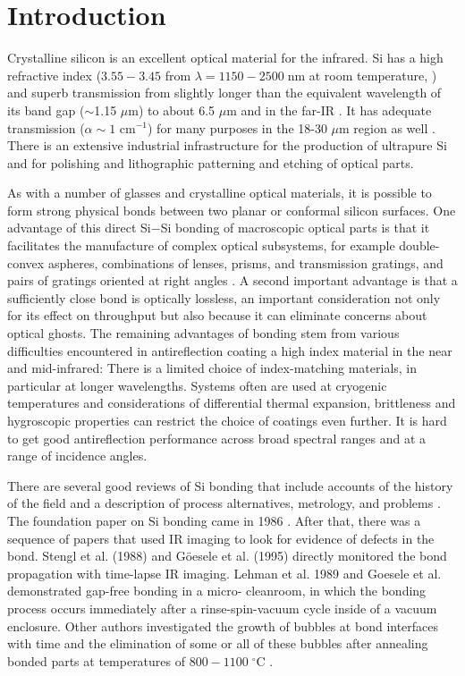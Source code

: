 \documentclass[osajnl,preprint,showpacs,superscriptaddress,12pt]{revtex4-1} %
\begin{document}
\section{Introduction}

Crystalline silicon is an excellent optical material for the infrared. Si has a high refractive index ($3.55-3.45$ from $\lambda = 1150-2500\;$nm at room temperature, \cite{2006SPIE.6273E..77F}) and superb transmission from slightly longer than the equivalent wavelength of its band gap ($\sim$1.15 $\mu$m) to about 6.5 $\mu$m \cite{PhysRev.108.268, PhysRev.78.178} and in the far-IR \cite{doi:10.1117/12.323764}.  It has adequate transmission  ($\alpha \sim 1$ cm$^{-1}$) for many purposes in the 18-30 $\mu$m region as well \cite{doi:10.1117/12.323764}.  There is an extensive industrial infrastructure for the production of ultrapure Si and for polishing and lithographic patterning and etching of optical parts.

As with a number of glasses and crystalline optical materials, it is possible to form strong physical bonds between two planar or conformal silicon surfaces.  One advantage of this direct Si$-$Si bonding of macroscopic optical parts is that it facilitates the manufacture of complex optical subsystems, for example double-convex aspheres, combinations of lenses, prisms, and transmission gratings, and pairs of gratings oriented at right angles \cite{2012SPIE.8450E..2TV, 2010SPIE.7739E.123G}.  A second important advantage is that a sufficiently close bond is optically lossless, an important consideration not only for its effect on throughput but also because it can eliminate concerns about optical ghosts.  The remaining advantages of bonding stem from various difficulties encountered in antireflection coating a high index material in the near and mid-infrared:  There is a limited choice of index-matching materials, in particular at longer wavelengths.  Systems often are used at cryogenic temperatures and considerations of differential thermal expansion, brittleness and hygroscopic properties can restrict the choice of coatings even further. It is hard to get good antireflection performance across broad spectral ranges and at a range of incidence angles.


There are several good reviews of Si bonding that include accounts of the history of the field and a description of process alternatives, metrology, and problems \cite{1998AnRMS..28..215G,Masteika2014}.  The foundation paper on Si bonding came in 1986 \cite{1986JAP....60.2987S}. After that, there was a sequence of papers that used IR imaging to look for evidence of defects in the bond. Stengl et al. (1988) and G{\"o}esele et al. (1995) \cite{1988JaJAP..27L2364S, 1995ApPhL..67.3614G} directly monitored the bond propagation with time-lapse IR imaging. Lehman et al. 1989 and Goesele et al. \cite{1989JaJAP..28L2141L, 1995ApPhL..67.3614G} demonstrated gap-free bonding in a micro- cleanroom, in which the bonding process occurs immediately after a rinse-spin-vacuum cycle inside of a vacuum enclosure.  Other authors investigated the growth of bubbles at bond interfaces with time and the elimination of some or all of these bubbles after annealing bonded parts at temperatures of $800-1100\;^\circ$C \cite{Horn2009, Masteika2014}.
\end{document}
